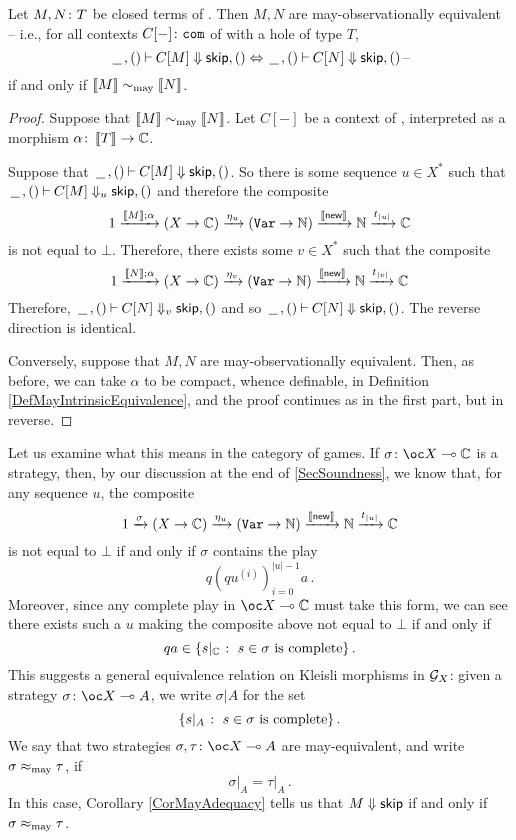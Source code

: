 \documentclass[11pt]{report}
\begin{document}
\begin{theorem}
  Let $M,N\colon T$ be closed terms of \IAX. Then $M,N$ are may-observationally equivalent -- i.e., for all contexts $C[-]\colon {\mathtt{com}}$ of \IAX with a hole of type $T$, \[
    \,\underline{\hspace{1.5ex}}\,,()\mathbin{\vdash} C[M] \Downarrow {\mathsf{skip}},() \Leftrightarrow \,\underline{\hspace{1.5ex}}\,,()\mathbin{\vdash} C[N] \Downarrow {\mathsf{skip}},()\,\text{--}
    \]
  if and only if $\left\llbracket M\right\rrbracket \sim_{\operatorname{may}} \left\llbracket N\right\rrbracket$.
\end{theorem}
\begin{proof}
  Suppose that $\left\llbracket M\right\rrbracket\sim_{\operatorname{may}}\left\llbracket N\right\rrbracket$.  
  Let $C[-]$ be a context of \IAX, interpreted as a morphism $\alpha \colon \left\llbracket T\right\rrbracket \to \mathbb{C}$.

  Suppose that $\,\underline{\hspace{1.5ex}}\,,()\mathbin{\vdash} C[M] \Downarrow {\mathsf{skip}},()$.  
  So there is some sequence $u\in X^*$ such that $\,\underline{\hspace{1.5ex}}\,,()\mathbin{\vdash} C[M] \Downarrow_u {\mathsf{skip}},()$ and therefore the composite
  \[
    1 \xrightarrow{\left\llbracket M\right\rrbracket;\alpha}
    (X \to \mathbb{C}) \xrightarrow{\eta_u}
    ({\mathtt{Var}} \to \mathbb{N}) \xrightarrow{\left\llbracket\operatorname{{\mathsf{new}}}\right\rrbracket}
    \mathbb{N} \xrightarrow{t_{|u|}}
    \mathbb{C}
    \]
  is not equal to $\bot$.  
  Therefore, there exists some $v\in X^*$ such that the composite
  \[
    1 \xrightarrow{\left\llbracket N\right\rrbracket;\alpha}
    (X \to \mathbb{C}) \xrightarrow{\eta_v}
    ({\mathtt{Var}} \to \mathbb{N}) \xrightarrow{\left\llbracket\operatorname{{\mathsf{new}}}\right\rrbracket}
    \mathbb{N} \xrightarrow{t_{|v|}}
    \mathbb{C}
    \]
  Therefore, $\,\underline{\hspace{1.5ex}}\,,()\mathbin{\vdash} C[N] \Downarrow_v {\mathsf{skip}},()$ and so $\,\underline{\hspace{1.5ex}}\,,()\mathbin{\vdash} C[N] \Downarrow {\mathsf{skip}},()$.
  The reverse direction is identical.

  Conversely, suppose that $M,N$ are may-observationally equivalent.  
  Then, as before, we can take $\alpha$ to be compact, whence definable, in Definition \ref{DefMayIntrinsicEquivalence}, and the proof continues as in the first part, but in reverse.
\end{proof}

Let us examine what this means in the category of games.
If $\sigma\from \oc X \implies \bC$ is a strategy, then, by our discussion at the end of \sec\ref{SecSoundness}, we know that, for any sequence $u$, the composite
\[
  1 \xrightarrow{\sigma}
  (X \to \mathbb{C}) \xrightarrow{\eta_u}
  ({\mathtt{Var}} \to \mathbb{N}) \xrightarrow{\left\llbracket\operatorname{{\mathsf{new}}}\right\rrbracket}
  \mathbb{N} \xrightarrow{t_{|u|}}
  \mathbb{C}
  \]
is not equal to $\bot$ if and only if $\sigma$ contains the play
\[
  q (q u^{(i)})_{i=0}^{|u|-1} a\,.
  \]
Moreover, since any complete play in $\oc X \implies \bC$ must take this form, we can see there exists such a $u$ making the composite above not equal to $\bot$ if and only if
\[
  qa \in \{s\vert_{\mathbb{C}} \;\colon\; s\in\sigma\text{ is complete}\}\,.
  \]
This suggests a general equivalence relation on Kleisli morphisms in $\mathcal G_X$: given a strategy $\sigma\from \oc X \implies A$, we write $\sigma\vert A$ for the set
\[
  \{s\vert_A \;\colon\; s\in \sigma\text{ is complete}\}\,.
  \]
We say that two strategies $\sigma,\tau\from \oc X \implies A$ are may-equivalent, and write $\sigma\approx_{\operatorname{may}}\tau$, if
\[
  \sigma\vert_A = \tau\vert_A\,.
  \]
In this case, Corollary \ref{CorMayAdequacy} tells us that $M\Downarrow {\mathsf{skip}}$ if and only if $\sigma\approx_{\operatorname{may}}\tau$.
\end{document}
